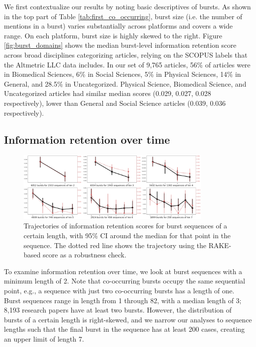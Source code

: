 \documentclass[letterpaper]{article} %
\begin{document}
We first contextualize our results by noting basic descriptives of bursts.
As shown in the top part of Table \ref{tab:first_co_occurring}, burst size (i.e. the number of mentions in a burst) varies substantially across platforms and covers a wide range. On each platform, burst size is highly skewed to the right. Figure \ref{fig:burst_domains} shows the median burst-level information retention score across broad disciplines categorizing articles, relying on the SCOPUS labels that the Altmetric LLC data includes. In our set of 9,765 articles, 56\% of articles were in Biomedical Sciences, 6\% in Social Sciences, 5\% in Physical Sciences, 14\% in General, and 28.5\% in Uncategorized. Physical Science, Biomedical Science, and Uncategorized articles had similar median scores (0.029, 0.027, 0.028 respectively), lower than General and Social Science articles (0.039, 0.036 respectively).

\subsection{Information retention over time}

\begin{figure}[ht]
    \centering
    \includegraphics[width=0.85\textwidth]{figs/trajectory_overall.png}
    \caption{Trajectories of information retention scores for burst sequences of a certain length, with 95\% CI around the median for that point in the sequence. The dotted red line shows the trajectory using the RAKE-based score as a robustness check.}
    \label{fig:sequences2_9}
\end{figure}

To examine information retention over time, we look at burst sequences with a minimum length of 2. Note that co-occurring bursts occupy the same sequential point, e.g., a sequence with just two co-occurring bursts has a length of one. Burst sequences range in length from 1 through 82, with a median length of 3; 8,193 research papers have at least two bursts. However, the distribution of bursts of a certain length is right-skewed, and we narrow our analyses to sequence lengths such that the final burst in the sequence has at least 200 cases, creating an upper limit of length 7.
\end{document}
